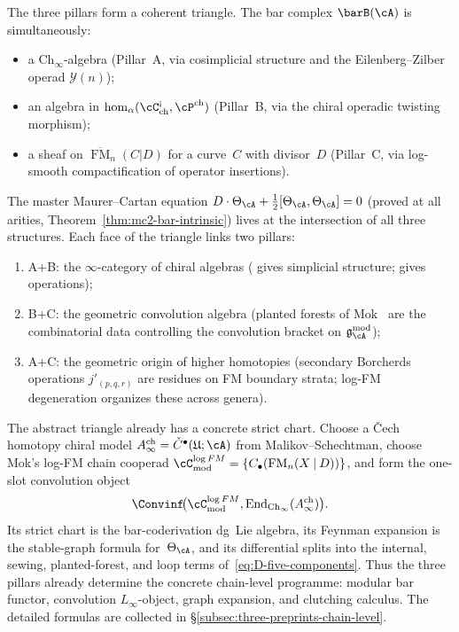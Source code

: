 \begin{remark}
\label{rem:three-pillar-triangle}
The three pillars form a coherent triangle.  The bar complex
$\barB(\cA)$ is simultaneously:
\begin{itemize}
\item a $\mathrm{Ch}_\infty$-algebra (Pillar~A, via cosimplicial structure
  and the Eilenberg--Zilber operad $\mathcal{Y}(n)$);
\item an algebra in
  $\operatorname{hom}_\alpha(\cC^{\textup{!`}}_{\mathrm{ch}},
  \cP^{\mathrm{ch}})$ (Pillar~B, via the chiral operadic twisting
  morphism);
\item a sheaf on $\overline{\operatorname{FM}}_n(C|D)$ for a curve~$C$
  with divisor~$D$ (Pillar~C, via log-smooth compactification of
  operator insertions).
\end{itemize}
The master Maurer--Cartan equation
$D \cdot \Theta_\cA + \tfrac{1}{2}[\Theta_\cA, \Theta_\cA] = 0$
(proved at all arities, Theorem~\ref{thm:mc2-bar-intrinsic})
lives at the intersection of all three structures.  Each face of the
triangle links two pillars:
\begin{enumerate}[label=\textup{(\roman*)}]
\item A+B: the $\infty$-category of chiral algebras
  (\cite[Theorem~3.8]{Val16} gives simplicial structure; \cite{MS24}
  gives operations);
\item B+C: the geometric convolution algebra (planted forests of
  Mok~\cite{Mok25} are the combinatorial data controlling the
  convolution bracket on $\mathfrak{g}_\cA^{\mathrm{mod}}$);
\item A+C: the geometric origin of higher homotopies (secondary Borcherds
  operations $j'_{(p,q,r)}$ are residues on FM boundary strata; log-FM
  degeneration organizes these across genera).
\end{enumerate}
\end{remark}


\begin{summary}
\label{sum:three-pillars-chain-level}
The abstract triangle already has a concrete strict chart.  Choose a
\v{C}ech homotopy chiral model
$A^{\mathrm{ch}}_\infty=\check C^\bullet(\mathfrak U;\cA)$ from
Malikov--Schechtman, choose Mok's log-FM chain cooperad
$\cC^{\log FM}_{\mathrm{mod}}=\{C_\bullet(\operatorname{FM}_n(X\mathbin{|}D))\}$,
and form the one-slot convolution object
\[
\Convinf\!\bigl(
\cC^{\log FM}_{\mathrm{mod}},
\operatorname{End}_{\mathrm{Ch}_\infty}(A^{\mathrm{ch}}_\infty)
\bigr).
\]
Its strict chart is the bar-coderivation dg~Lie algebra, its Feynman
expansion is the stable-graph formula for~$\Theta_\cA$, and its
differential splits into the internal, sewing, planted-forest, and loop
terms of~\eqref{eq:D-five-components}.  Thus the three pillars already
determine the concrete chain-level programme: modular bar functor,
convolution $L_\infty$-object, graph expansion, and clutching calculus.
The detailed formulas are collected in
\S\ref{subsec:three-preprints-chain-level}.
\end{summary}

